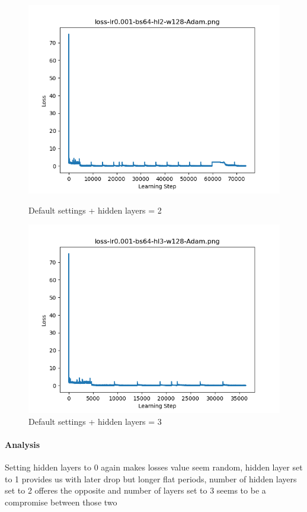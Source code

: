 \documentclass{article}[12pt]
\begin{document}
        \begin{figure}[H]
        \includegraphics[width=\linewidth]{testsResults/loss/hl/def.png}
        \caption{Default settings + hidden layers = 2}
        \endminipage
        \includegraphics[width=\linewidth]{testsResults/loss/hl/loss-lr0.001-bs64-hl3-w128-Adam.png}
        \caption{Default settings + hidden layers = 3}
        \endminipage
    \end{figure}

    \paragraph{Analysis} Setting hidden layers to 0 again makes losses value seem random, hidden layer set to 1 provides us with later drop but longer flat periods, number of hidden layers set to 2 offeres the opposite and number of layers set to 3 seems to be a compromise between those two 
\end{document}
